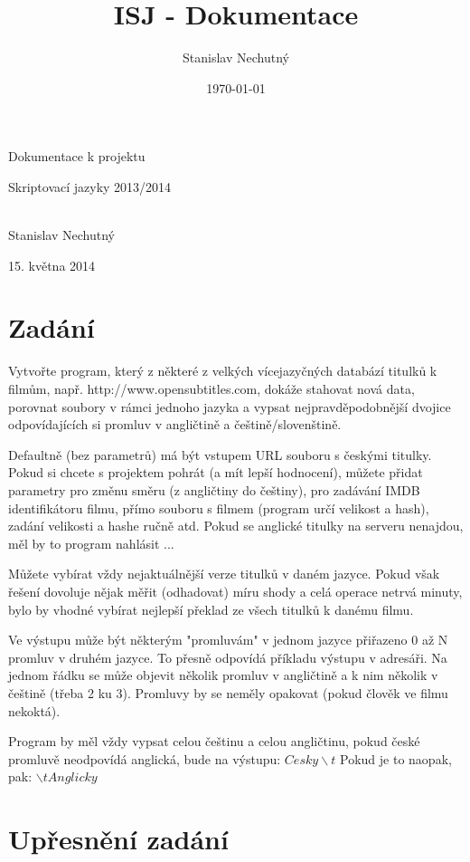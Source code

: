 \documentclass[a4paper,12]{article}
\title{ISJ - Dokumentace}
\author{Stanislav Nechutný}
\date{\today}
\begin{document}
\begin{center}
	\begin{LARGE}Dokumentace k projektu\end{LARGE}

	\begin{Large}Skriptovací jazyky 2013/2014\end{Large}
	\\ [6in]
	
	Stanislav Nechutný
	
	15. května 2014
\end{center}
\pagebreak

\part*{Zadání}
Vytvořte program, který z některé z velkých vícejazyčných databází titulků k filmům, např. http://www.opensubtitles.com, dokáže stahovat nová data, porovnat soubory v rámci jednoho jazyka a vypsat nejpravděpodobnější dvojice odpovídajících si promluv v angličtině a češtině/slovenštině.

Defaultně (bez parametrů) má být vstupem URL souboru s českými titulky. Pokud si chcete s projektem pohrát (a mít lepší hodnocení), můžete přidat parametry pro změnu směru (z angličtiny do češtiny), pro zadávání IMDB identifikátoru filmu, přímo souboru s filmem (program určí velikost a hash), zadání velikosti a hashe ručně atd. Pokud se anglické titulky na serveru nenajdou, měl by to program nahlásit ...

Můžete vybírat vždy nejaktuálnější verze titulků v daném jazyce. Pokud však řešení dovoluje nějak měřit (odhadovat) míru shody a celá operace netrvá minuty, bylo by vhodné vybírat nejlepší překlad ze všech titulků k danému filmu.

Ve výstupu může být některým "promluvám" v jednom jazyce přiřazeno 0 až N promluv v druhém jazyce. To přesně odpovídá příkladu výstupu v adresáři. Na jednom řádku se může objevit několik promluv v angličtině a k nim několik v češtině (třeba 2 ku 3). Promluvy by se neměly opakovat (pokud člověk ve filmu nekoktá).

Program by měl vždy vypsat celou češtinu a celou angličtinu, pokud české promluvě neodpovídá anglická, bude na výstupu:
$ Cesky \backslash t$
Pokud je to naopak, pak:
$\backslash t Anglicky$

\pagebreak

\part*{Upřesnění zadání}
\end{document}
